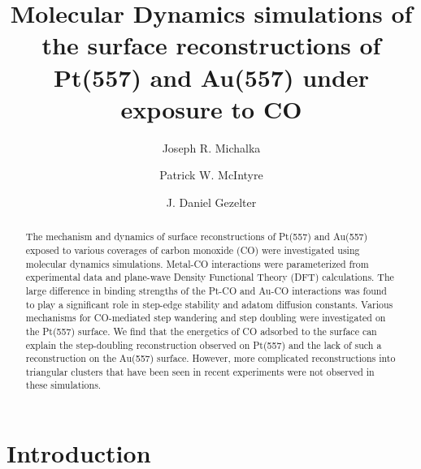 \documentclass[journal = jpccck, manuscript = article]{achemso}
\title{Molecular Dynamics simulations of the surface reconstructions
  of Pt(557) and Au(557) under exposure to CO}
\author{Joseph R. Michalka}
\author{Patrick W. McIntyre}
\author{J. Daniel Gezelter}
\affiliation[University of Notre Dame]{251 Nieuwland Science Hall\\
  Department of Chemistry and Biochemistry\\ University of Notre
  Dame\\ Notre Dame, Indiana 46556}
\begin{document}
 
%
%


\begin{abstract}
  The mechanism and dynamics of surface reconstructions of Pt(557) and
  Au(557) exposed to various coverages of carbon monoxide (CO) were
  investigated using molecular dynamics simulations.  Metal-CO
  interactions were parameterized from experimental data and
  plane-wave Density Functional Theory (DFT) calculations.  The large
  difference in binding strengths of the Pt-CO and Au-CO interactions
  was found to play a significant role in step-edge stability and
  adatom diffusion constants.  Various mechanisms for CO-mediated step
  wandering and step doubling were investigated on the Pt(557)
  surface.  We find that the energetics of CO adsorbed to the surface
  can explain the step-doubling reconstruction observed on Pt(557) and
  the lack of such a reconstruction on the Au(557) surface.  However,
  more complicated reconstructions into triangular clusters that have
  been seen in recent experiments were not observed in these
  simulations.
\end{abstract}

\newpage


\section{Introduction}
%
\end{document}
